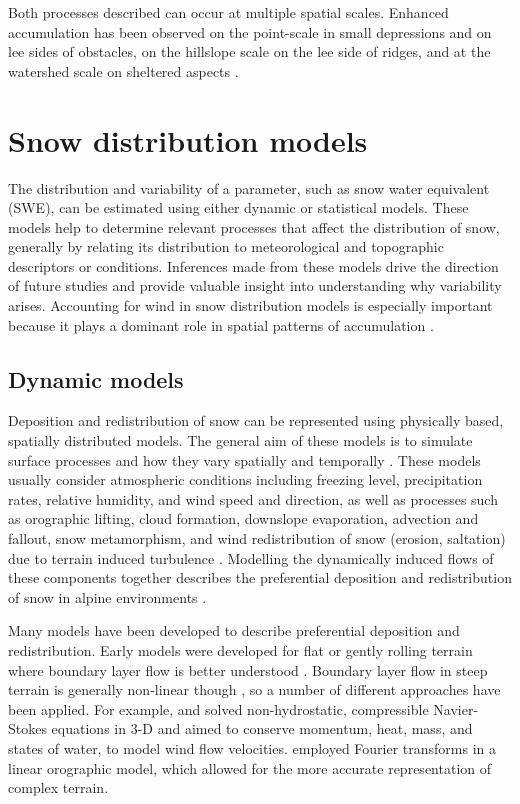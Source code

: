 \documentclass{sfuthesis}
\begin{document}
Both processes described can occur at multiple spatial scales. Enhanced accumulation has been observed on the point-scale in small depressions and on lee sides of obstacles, on the hillslope scale on the lee side of ridges, and at the watershed scale on sheltered aspects \citep{Harrison1986, Bloeschl1992, Mott2008, Winstral2002, Clark2011}. 

\section{Snow distribution models}
The distribution and variability of a parameter, such as snow water equivalent (SWE), can be estimated using either dynamic or statistical models. These models help to determine relevant processes that affect the distribution of snow, generally by relating its distribution to meteorological and topographic descriptors or conditions. Inferences made from these models drive the direction of future studies and provide valuable insight into understanding why variability arises. Accounting for wind in snow distribution models is especially important because it plays a dominant role in spatial patterns of accumulation \citep{Winstral2013}.

\subsection{Dynamic models}
Deposition and redistribution of snow can be represented using physically based, spatially distributed models. The general aim of these models is to simulate surface processes and how they vary spatially and temporally \citep{Mott2008}. These models usually consider atmospheric conditions including freezing level, precipitation rates, relative humidity, and wind speed and direction, as well as processes such as orographic lifting, cloud formation, downslope evaporation, advection and fallout, snow metamorphism, and wind redistribution of snow (erosion, saltation) due to terrain induced turbulence \citep{Smith2004, Liston2006, Lehning2008, Mott2008}.  Modelling the dynamically induced flows of these components together describes the preferential deposition and redistribution of snow in alpine environments \citep{Lehning2008,Mott2008,Dadic2010}.

Many models have been developed to describe preferential deposition and redistribution. Early models were developed for flat or gently rolling terrain where boundary layer flow is better understood \citep{Dadic2010}. Boundary layer flow in steep terrain is generally non-linear though \citep{Mott2008, Dadic2010}, so a number of different approaches have been applied.  For example, \cite{Dadic2010} and \citep{Lehning2008} solved non-hydrostatic, compressible Navier-Stokes equations in 3-D and aimed to conserve momentum, heat, mass, and states of water, to model wind flow velocities. \cite{Smith2004} employed Fourier transforms in a linear orographic model, which allowed for the more accurate representation of complex terrain. 
\end{document}
